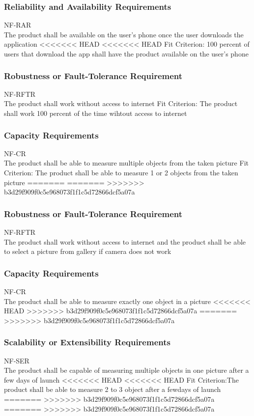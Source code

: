 \documentclass[12pt, titlepage]{article}
\begin{document}
\subsubsection{Reliability and Availability Requirements}
NF-RAR \\
The product shall be available on the user’s phone once the user downloads the application 
<<<<<<< HEAD
<<<<<<< HEAD
{\color{red}Fit Criterion: 100 percent of users that download the app shall have the product available on the user's phone}

\subsubsection{Robustness or Fault-Tolerance Requirement}
NF-RFTR \\
The product shall work without access to internet
{\color{red}Fit Criterion: The product shall work 100 percent of the time wihtout access to internet }

\subsubsection{Capacity Requirements}
NF-CR \\
{\color{red}The product shall be able to measure multiple objects from the taken picture }
{\color{red}Fit Criterion: The product shall be able to measure 1 or 2 objects from the taken picture }
=======
=======
>>>>>>> b3d29f909f0c5e968073f1f1c5d72866dcf5a07a

\subsubsection{Robustness or Fault-Tolerance Requirement}
NF-RFTR \\
The product shall work without access to internet and the product shall be able to select a picture from gallery if camera does not work

\subsubsection{Capacity Requirements}
NF-CR \\
The product shall be able to measure exactly one object in a picture 
<<<<<<< HEAD
>>>>>>> b3d29f909f0c5e968073f1f1c5d72866dcf5a07a
=======
>>>>>>> b3d29f909f0c5e968073f1f1c5d72866dcf5a07a

\subsubsection{Scalability or Extensibility Requirements}
NF-SER \\
The product shall be capable of measuring multiple objects in one picture after a few days of launch
<<<<<<< HEAD
<<<<<<< HEAD
{\color{red}Fit Criterion:The product shall be able to measure 2 to 3 object after a fewdays of launch }
=======
>>>>>>> b3d29f909f0c5e968073f1f1c5d72866dcf5a07a
=======
>>>>>>> b3d29f909f0c5e968073f1f1c5d72866dcf5a07a
\end{document}
